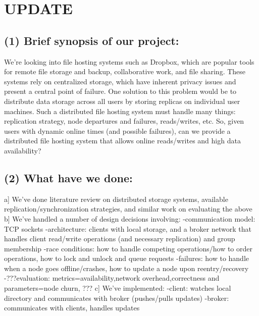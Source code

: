 \section{UPDATE}
\subsection{(1) Brief synopsis of our project:}
We're looking into file hosting systems such as Dropbox, which are popular tools for remote file storage and backup, collaborative work, and file sharing.
These systems rely on centralized storage, which have inherent privacy issues and present a central point of failure.
One solution to this problem would be to distribute data storage across all users by storing replicas on individual user machines.
Such a distributed file hosting system must handle many things: replication strategy, node departures and failures, reads/writes, etc.
So, given users with dynamic online times (and possible failures), can we provide a distributed file hosting system that allows online reads/writes and high data availability?

\subsection{(2) What have we done:}
  a] We've done literature review on distributed storage systems, available replication/synchronization strategies, and similar work on evaluating the above
    b] We've handled a number of design decisions involving:
          -communication model: TCP sockets
                -architecture: clients with local storage, and a broker network that handles client read/write operations (and necessary replication) and group membership
                      -race conditions: how to handle competing operations/how to order operations, how to lock and unlock and queue requests
                            -failures: how to handle when a node goes offline/crashes, how to update a node upon reentry/recovery
                                  -???evaluation: metrics=availability,network overhead,correctness and parameters=node churn, ???
                                    c] We've implemented:
                                          -client: watches local directory and communicates with broker (pushes/pulls updates)
                                                -broker: communicates with clients, handles updates
                                                
